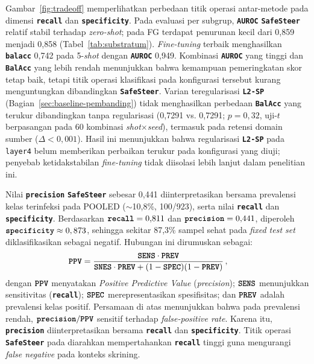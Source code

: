 \documentclass[conference]{IEEEtran}
\newcommand{\nama}[1]{\textbf{\texttt{#1}}}
\begin{document}
Gambar~\ref{fig:tradeoff} memperlihatkan perbedaan titik operasi antar-metode pada dimensi \nama{recall} dan \nama{specificity}. Pada evaluasi per subgrup, \nama{AUROC} \nama{SafeSteer} relatif stabil terhadap \textit{zero-shot}; pada FG terdapat penurunan kecil dari 0,859 menjadi 0,858 (Tabel~\ref{tab:substratum}).
\textit{Fine-tuning} terbaik menghasilkan \nama{balacc} 0,742 pada 5-\textit{shot} dengan \nama{AUROC} 0,949. Kombinasi \nama{AUROC} yang tinggi dan \nama{BalAcc} yang lebih rendah menunjukkan bahwa kemampuan pemeringkatan skor tetap baik, tetapi titik operasi klasifikasi pada konfigurasi tersebut kurang menguntungkan dibandingkan \nama{SafeSteer}. Varian teregularisasi \nama{L2-SP} (Bagian~\ref{sec:baseline-pembanding}) tidak menghasilkan perbedaan \nama{BalAcc} yang terukur dibandingkan tanpa regularisasi (0,7291 vs. 0,7291; $p=0{,}32$, uji-$t$ berpasangan pada 60 kombinasi \textit{shot}$\times$\textit{seed}), termasuk pada retensi domain sumber ($\Delta<0{,}001$). Hasil ini menunjukkan bahwa regularisasi \nama{L2-SP} pada \texttt{layer4} belum memberikan perbaikan terukur pada konfigurasi yang diuji; penyebab ketidakstabilan \textit{fine-tuning} tidak diisolasi lebih lanjut dalam penelitian ini.

Nilai \nama{precision} \nama{SafeSteer} sebesar 0,441 diinterpretasikan bersama prevalensi kelas terinfeksi pada POOLED ($\sim$10,8\%, 100/923), serta nilai \nama{recall} dan \nama{specificity}. Berdasarkan $\nama{recall}=0{,}811$ dan $\nama{precision}=0{,}441$, diperoleh $\nama{specificity} \approx 0,873$, sehingga sekitar 87,3\% sampel sehat pada \textit{fixed test set} diklasifikasikan sebagai negatif. Hubungan ini dirumuskan sebagai:
\begin{equation}
\nama{PPV} = \frac{\nama{SENS} \cdot \nama{PREV}}{\nama{SNES} \cdot \nama{PREV} + (1 - \nama{SPEC})(1 - \nama{PREV})} \, ,
\tag*{}\label{eq:ppv}
\end{equation}
dengan $\nama{PPV}$ menyatakan \textit{Positive Predictive Value} (\textit{precision}); $\nama{SENS}$ menunjukkan sensitivitas (\nama{recall}); $\nama{SPEC}$ merepresentasikan spesifisitas; dan $\nama{PREV}$ adalah prevalensi kelas positif. Persamaan di atas menunjukkan bahwa pada prevalensi rendah, $\nama{precision}/\nama{PPV}$ sensitif terhadap \textit{false-positive rate}. Karena itu, \nama{precision} diinterpretasikan bersama \nama{recall} dan \nama{specificity}. Titik operasi \nama{SafeSteer} pada diarahkan mempertahankan \nama{recall} tinggi guna mengurangi \textit{false negative} pada konteks skrining.
\end{document}
